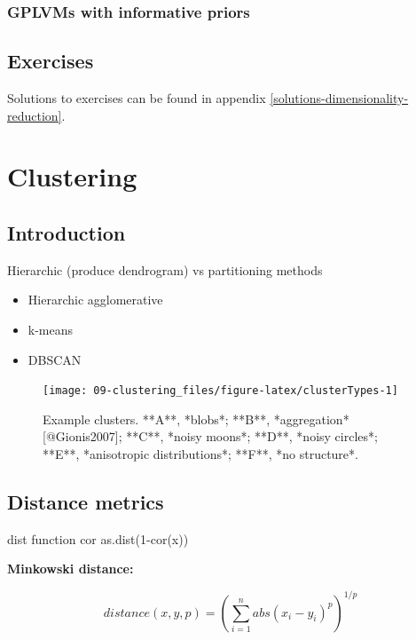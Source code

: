 \documentclass[]{book}
\providecommand{\tightlist}{%
  \setlength{\itemsep}{0pt}\setlength{\parskip}{0pt}}
\theoremstyle{definition}
\theoremstyle{definition}
\theoremstyle{definition}
\theoremstyle{remark}
\begin{document}
\subsection{GPLVMs with informative
priors}\label{gplvms-with-informative-priors}

\section{Exercises}\label{exercises-6}

Solutions to exercises can be found in appendix
\ref{solutions-dimensionality-reduction}.

\chapter{Clustering}\label{clustering}

\section{Introduction}\label{introduction}

Hierarchic (produce dendrogram) vs partitioning methods

\begin{itemize}
\tightlist
\item
  Hierarchic agglomerative
\item
  k-means
\item
  DBSCAN
\end{itemize}

\begin{figure}

{\centering \texttt{[image: 09-clustering\_files/figure-latex/clusterTypes-1]} 

}

\caption{Example clusters. **A**, *blobs*; **B**, *aggregation* [@Gionis2007]; **C**, *noisy moons*; **D**, *noisy circles*; **E**, *anisotropic distributions*; **F**, *no structure*.}\label{fig:clusterTypes}
\end{figure}

\section{Distance metrics}\label{distance-metrics}

dist function cor as.dist(1-cor(x))

\textbf{Minkowski distance:}

\begin{equation}
  distance\left(x,y,p\right)=\left(\sum_{i=1}^{n} abs(x_i-y_i)^p\right)^{1/p}
  \label{eq:minkowski}
\end{equation}
\end{document}
